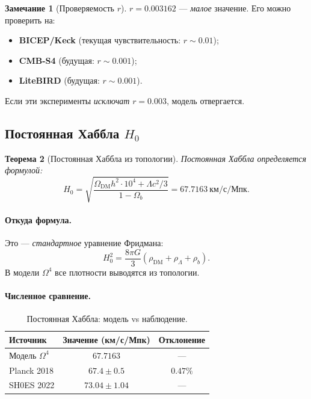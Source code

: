 \documentclass[11pt,a4paper]{article}
\newcommand{\Om}{\Omega^4}
\newtheorem{theorem}{Теорема}[section]
\theoremstyle{definition}
\newtheorem{remark}[theorem]{Замечание}
\begin{document}
\begin{remark}[Проверяемость $r$]
\label{rem:r-testability}
$r = 0.003162$ — \emph{малое} значение. Его можно проверить 
на:
\begin{itemize}
    \item \textbf{BICEP/Keck} (текущая чувствительность: 
          $r \sim 0.01$);
    \item \textbf{CMB-S4} (будущая: $r \sim 0.001$);
    \item \textbf{LiteBIRD} (будущая: $r \sim 0.001$).
\end{itemize}
Если эти эксперименты \emph{исключат} $r = 0.003$, 
модель отвергается.
\end{remark}

\subsection{Постоянная Хаббла $H_0$}
\label{subsec:h0}

\begin{theorem}[Постоянная Хаббла из топологии]
\label{thm:h0}
Постоянная Хаббла определяется формулой:
\begin{equation}
    \boxed{
    H_0 = \sqrt{\frac{\Omega_{\text{DM}} h^2 \cdot 10^4 
    + \Lambda c^2 / 3}{1 - \Omega_b}}
    = 67.7163~\text{км/с/Мпк}.
    }
    \label{eq:h0-main}
\end{equation}
\end{theorem}

\paragraph{Откуда формула.}
Это — \emph{стандартное} уравнение Фридмана:
\begin{equation}
    H_0^2 = \frac{8\pi G}{3}(\rho_{\text{DM}} + \rho_\Lambda 
    + \rho_b).
\end{equation}
В модели $\Om$ все плотности выводятся из топологии.

\paragraph{Численное сравнение.}
\begin{table}[htbp]
\centering
\caption{Постоянная Хаббла: модель vs наблюдение.}
\label{tab:h0-comparison}
\begin{tabular}{lcc}
\toprule
Источник & Значение (км/с/Мпк) & Отклонение \\ 
\midrule
Модель $\Om$ & $67.7163$ & --- \\[0.3em]
Planck 2018 & $67.4 \pm 0.5$ & $0.47\%$ \\[0.3em]
SH0ES 2022 & $73.04 \pm 1.04$ & --- \\ 
\bottomrule
\end{tabular}
\end{table}
\end{document}
